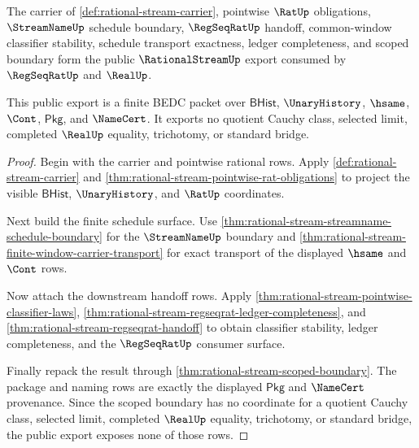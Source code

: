 \begin{theorem}\label{thm:rational-stream-public-export}
The carrier of \autoref{def:rational-stream-carrier}, pointwise $\RatUp$
obligations, $\StreamNameUp$ schedule boundary, $\RegSeqRatUp$ handoff,
common-window classifier stability, schedule transport exactness, ledger
completeness, and scoped boundary form the public $\RationalStreamUp$ export
consumed by $\RegSeqRatUp$ and $\RealUp$.

This public export is a finite BEDC packet over $\mathsf{BHist}$,
$\UnaryHistory$, $\hsame$, $\Cont$, $\mathsf{Pkg}$, and $\NameCert$. It exports
no quotient Cauchy class, selected limit, completed $\RealUp$ equality,
trichotomy, or standard bridge.
\end{theorem}
\begin{proof}
Begin with the carrier and pointwise rational rows. Apply
\autoref{def:rational-stream-carrier} and
\autoref{thm:rational-stream-pointwise-rat-obligations} to project the visible
$\mathsf{BHist}$, $\UnaryHistory$, and $\RatUp$ coordinates.

Next build the finite schedule surface. Use
\autoref{thm:rational-stream-streamname-schedule-boundary} for the
$\StreamNameUp$ boundary and
\autoref{thm:rational-stream-finite-window-carrier-transport} for exact
transport of the displayed $\hsame$ and $\Cont$ rows.

Now attach the downstream handoff rows. Apply
\autoref{thm:rational-stream-pointwise-classifier-laws},
\autoref{thm:rational-stream-regseqrat-ledger-completeness}, and
\autoref{thm:rational-stream-regseqrat-handoff} to obtain classifier
stability, ledger completeness, and the $\RegSeqRatUp$ consumer surface.

Finally repack the result through \autoref{thm:rational-stream-scoped-boundary}.
The package and naming rows are exactly the displayed $\mathsf{Pkg}$ and
$\NameCert$ provenance. Since the scoped boundary has no coordinate for a
quotient Cauchy class, selected limit, completed $\RealUp$ equality,
trichotomy, or standard bridge, the public export exposes none of those rows.
\end{proof}

